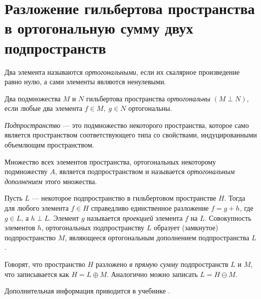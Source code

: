\section{Разложение гильбертова пространства в ортогональную сумму двух подпространств}
\label{sec:q-23}

Два элемента называются \textit{ортогональными}, если их скалярное произведение равно нулю, а сами элементы являются ненулевыми.

Два подмножества $M$ и $N$ гильбертова пространства \textit{ортогональны} $(M \perp N)$, если любые два элемента $f \in M,\;g \in N$ ортогональны.

\textit{Подпространство} --- это подмножество некоторого пространства, которое само является пространством соответствующего типа со свойствами, индуцированными объемлющим пространством.

Множество всех элементов пространства, ортогональных некоторому подмножеству $A$, является подпространством и называется \textit{ортогональным дополнением} этого множества.

Пусть $L$ --- некоторое подпространство в гильбертовом пространстве $H$. Тогда для любого элемента $f \in H$ справедливо единственное разложение $f=g+h$, где $g \in L$, а $h \perp L$. Элемент $g$ называется \textit{проекцией} элемента $f$ на $L$. Совокупность элементов $h$, ортогональных подпространству $L$ образует (замкнутое) подпространство $M$, являющееся ортогональным дополнением подпространства $L$.

Говорят, что пространство $H$ разложено \textit{в прямую сумму} подпространств $L$ и $M$, что записывается как $H=L \oplus M$. Аналогично можно записать $L=H \ominus M$.

Дополнительная информация приводится в учебнике \cite[с.~53]{trenogin}.